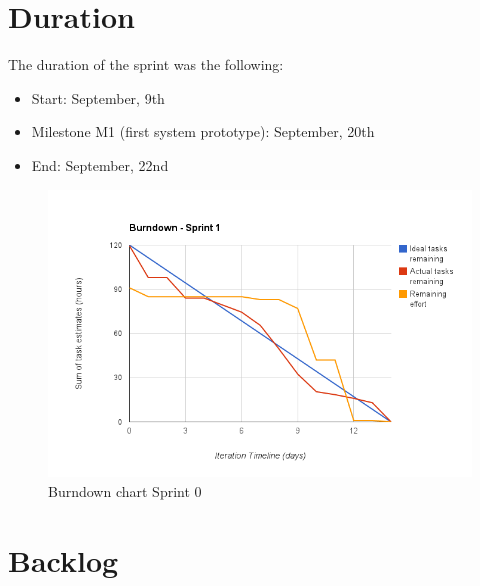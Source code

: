 \section{Duration}
The duration of the sprint was the following:
\begin{itemize}
\item Start: September, 9th
\item Milestone M1 (first system prototype): September, 20th
\item End: September, 22nd
\end{itemize}

\begin{figure}[H]
\centering
\includegraphics[scale=0.60]{../Figures/burndownSprint1.png}
\caption{Burndown chart Sprint 0}
\label{figure:burndownsprint0}
\end{figure}

\section{Backlog}


